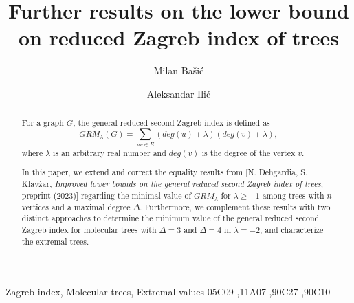 \documentclass[preprint,12pt]{elsarticle}
\begin{document}
\newcommand{\Z}{{\mathbb Z}}
\newcommand{\N}{{\mathbb N}}
\newcommand{\Hi}{{\mathbb H}}
\newcommand{\R}{{\mathbb R}}
\newcommand{\Q}{{\mathbb Q}}
\newcommand{\ICG}{\mathrm{ICG}}
\newcommand{\WCG}{\mathrm{WCG}}
\newcommand{\WICG}{\mathrm{WICG}}

\newtheorem{theorem}{\bf Theorem}[section]
\newtheorem{corollary}[theorem]{\bf Corollary}
\newtheorem{lemma}[theorem]{\bf Lemma}
\newtheorem{proposition}[theorem]{\bf Proposition}
\newtheorem{conjecture}[theorem]{\bf Conjecture}
\newtheorem{remark}[theorem]{\bf Remark}
\newtheorem{problem}[theorem]{\bf Problem}
\newtheorem{definition}[theorem]{\bf Definition}



\newcommand{\QED} {\hfill$\square$}

\def\slika #1{\begin{center} \epsffile{#1} \end{center}}


\begin{frontmatter}


\title{Further results on the lower bound on reduced Zagreb index of trees}

\author[address1]{Milan Ba\v si\'c}
\address[address1]{University of Ni\v s, Ni\v s, Serbia}

\author[address2]{Aleksandar Ili\'c}
\address[address2]{Meta Inc, Menlo Park, USA}

\begin{abstract}
For a graph $G$, the general reduced second Zagreb index is defined as
$$GRM_\lambda (G) = \sum_{uv \in E} (deg(u) + \lambda) (deg(v) + \lambda),$$
where $\lambda$ is an arbitrary real number and $deg (v)$ is the degree of the vertex $v$.

In this paper, we extend and correct the equality results from [N. Dehgardia, S. Klav\v zar, {\it Improved lower bounds on the general reduced second Zagreb index of trees}, preprint (2023)] regarding the minimal value of $GRM_\lambda$ for $\lambda \geq -1$ among trees with $n$ vertices and a maximal degree $\Delta$. Furthermore, we complement these results with two distinct approaches to determine the minimum value of the general reduced second Zagreb index for molecular trees with $\Delta = 3$ and $\Delta = 4$ in $\lambda = -2$, and characterize the extremal trees.
\end{abstract}

\begin{keyword}
Zagreb index, Molecular trees, Extremal values
\MSC 05C09 \sep 11A07 \sep 	90C27 \sep 	90C10
\end{keyword}

\end{frontmatter}
\end{document}
